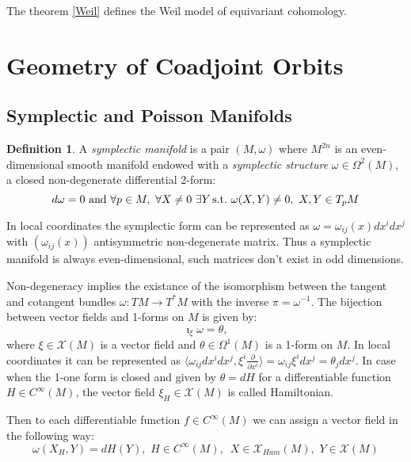 \documentclass[11pt]{report}
\theoremstyle{plain}
\theoremstyle{definition}
\newtheorem{defn}[thm]{Definition}
\theoremstyle{remark}
\theoremstyle{remark}
\numberwithin{equation}{section}
\begin{document}
The theorem \ref{Weil} defines the Weil model of equivariant cohomology.


\section{Geometry of Coadjoint Orbits}

\subsection{Symplectic and Poisson Manifolds}

\begin{defn}
 A \textit{symplectic manifold} is a pair $(M,\omega)$ where $M^{2n}$ is an even-dimensional smooth manifold endowed with a \textit{symplectic structure} $\omega \in \Omega^2(M)$, a closed non-degenerate differential 2-form:
 $$ d\omega = 0 \, \, {\rm and} \, \, \forall p\in M, \, \, \forall X \ne 0 \, \, \exists Y \, {\rm s. t.} \,\, \omega(X,Y)\ne 0, \, \,  X, Y\in T_pM $$
 \end{defn}
 
 In local coordinates the symplectic form can be represented as $\omega = \omega_{ij}(x) dx^idx^j$ with $(\omega_{ij}(x))$ antisymmetric non-degenerate matrix. Thus a symplectic manifold is always even-dimensional, such matrices don\rq{}t exist in odd dimensions. 
 
 Non-degeneracy implies the existance of the isomorphism between the tangent and cotangent bundles $\omega: TM \to T^*M$ with the inverse $\pi = \omega^{-1}$.
 The bijection between vector fields and 1-forms on $M$ is given by:
 \begin{equation}
 \imath_\xi \omega = \theta,
 \end{equation}
 where $\xi\in\mathcal{X}(M)$ is a vector field and $\theta \in\Omega^1(M)$ is a 1-form on $M$.
 In local coordinates it can be represented as $\langle \omega_{ij}dx^idx^j, \xi^i\frac{\partial}{\partial x^i} \rangle = \omega_{ij}\xi^idx^j = \theta_jdx^j$.
 In case when the 1-one form is closed and given by $\theta = dH$ for a differentiable function $H\in C^{\infty}(M)$, the vector field $\xi_H\in\mathcal{X}(M)$ is called Hamiltonian. 
 
Then to each differentiable function $f \in C^\infty(M)$ we can assign a vector field in the following way:
\begin{equation}
\omega(X_H, Y) = dH(Y), \, \, H\in C^\infty(M), \, \, \, X \in \mathcal{X}_{Ham}(M), \,\, Y \in \mathcal{X}(M)
\end{equation}
\end{document}
